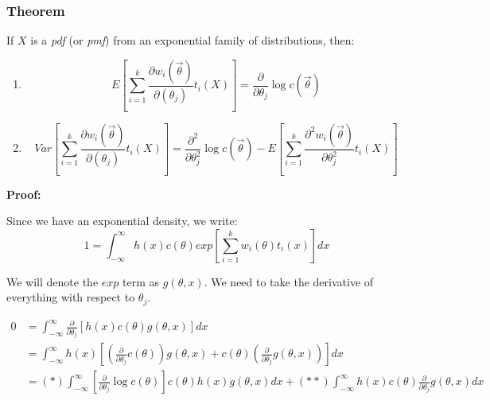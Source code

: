 \documentclass{article}
\begin{document}
\subsubsection{Theorem}

If $X$ is a \textit{pdf} (or \textit{pmf}) from an exponential family of distributions, then:
\begin{enumerate}
    \item \begin{equation*}
        E\left[\sum_{i=1}^k \frac{\partial w_i(\overrightarrow{\theta})}{\partial (\theta_j)} t_i(X)\right] = \frac{\partial}{\partial \theta_j} \log c(\overrightarrow{\theta})
    \end{equation*}
    
    \item \begin{equation*}
        Var\left[\sum_{i=1}^k \frac{\partial w_i(\overrightarrow{\theta})}{\partial (\theta_j)} t_i(X)\right] = \frac{\partial^2}{\partial \theta_j^2} \log c(\overrightarrow{\theta}) - E\left[\sum_{i=1}^k \frac{\partial^2 w_i(\overrightarrow{\theta})}{\partial \theta_j^2} t_i(X)\right]
    \end{equation*}
\end{enumerate}
    
    \textbf{Proof:}
    
    Since we have an exponential density, we write:
    \begin{equation*}
        1 = \int_{-\infty}^\infty h(x) c(\theta) exp\left[\sum_{i=1}^k w_i(\theta) t_i(x)\right]dx
    \end{equation*}
    
    We will denote the $exp$ term as $g(\theta,x)$. We need to take the derivative of everything with respect to $\theta_j$.
    
    \begin{equation*}
        \begin{split}
            0 &= \int_{-\infty}^\infty \frac{\partial}{\partial \theta_j} \left[ h(x) c(\theta) g(\theta,x) \right] dx\\
            &= \int_{-\infty}^\infty h(x) \left[ \left(\frac{\partial}{\partial \theta_j}c(\theta) \right) g(\theta,x) + c(\theta)\left(\frac{\partial}{\partial \theta_j} g(\theta,x) \right) \right] dx\\
            &= (*) \int_{-\infty}^\infty \left[\frac{\partial}{\partial \theta_j}\log c(\theta)\right] c(\theta)h(x)g(\theta,x) dx + (**)
            \int_{-\infty}^\infty h(x)c(\theta)\frac{\partial}{\partial \theta_j} g(\theta,x)dx \\
        \end{split}
    \end{equation*}
    
\end{document}
